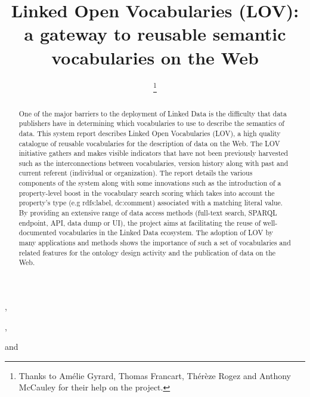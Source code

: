 \documentclass{iosart2c}
\begin{document}
\begin{frontmatter}                        %

%
\title{Linked Open Vocabularies (LOV): a gateway to reusable semantic vocabularies on the Web}




\author[A]{ \thanks{Thanks to Am\'elie Gyrard, Thomas Francart, Th\'er\`{e}ze Rogez and Anthony McCauley for their help on the project.}},
\author[B]{ },
\author[C]{ }
and
\author[D]{ }
\address[A]{Fujitsu (Ireland) Limited, Swords, Co. Dublin, Ireland\\
E-mail: pierre-yves.vandenbussche@ie.fujitsu.com}
\address[B]{Mondeca, 35 boulevard de Strasbourg, 75010 Paris, France\\
E-mail: ghislain.atemezing@mondeca.com}
\address[C]{Ontology Engineering Group (OEG), 
Universidad Polit\'ecnica de Madrid, Madrid, Spain\\
E-mail: mpoveda@fi.upm.es}
\address[D]{Mondeca, 35 boulevard de Strasbourg, 75010 Paris, France
\\
E-mail: bernard.vatant@mondeca.com}


\begin{abstract}
One of the major barriers to the deployment of Linked Data is the difficulty that data publishers have in determining which vocabularies to use to describe the semantics of data. This system report describes Linked Open Vocabularies (LOV), a high quality catalogue of reusable vocabularies for the description of data on the Web. The LOV initiative gathers and makes visible indicators that have not been previously harvested such as the interconnections between vocabularies, version history along with past and current referent (individual or organization). The report details the various components of the system along with some innovations such as the introduction of a property-level boost in the vocabulary search scoring which takes into account the property's type (e.g rdfs:label, dc:comment) associated with a matching literal value. By providing an extensive range of data access methods (full-text search, SPARQL endpoint, API, data dump or UI), the project aims at facilitating the reuse of well-documented vocabularies in the Linked Data ecosystem. The adoption of LOV by many applications and methods shows the importance of such a set of vocabularies and related features for the ontology design activity and the publication of data on the Web.
\end{abstract}


\end{frontmatter}
\end{document}

